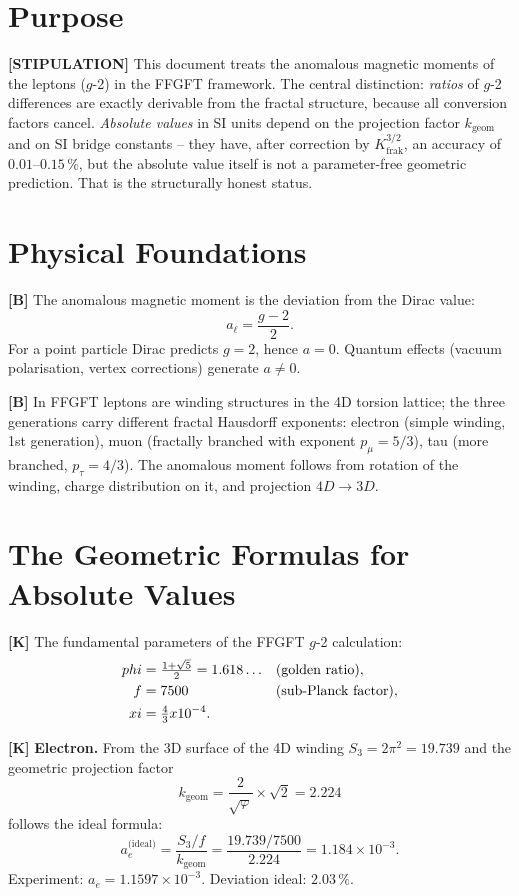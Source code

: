 \section{Purpose}

\textbf{[STIPULATION]} This document treats the anomalous magnetic moments of the
leptons ($g$-2) in the FFGFT framework. The central distinction: \emph{ratios} of
$g$-2 differences are exactly derivable from the fractal structure, because all
conversion factors cancel. \emph{Absolute values} in SI units depend on the
projection factor $k_\text{geom}$ and on SI bridge constants -- they have, after
correction by $K_\text{frak}^{3/2}$, an accuracy of $0{.}01$--$0{.}15\,\%$, but
the absolute value itself is not a parameter-free geometric prediction. That is
the structurally honest status.

\section{Physical Foundations}

\textbf{[B]} The anomalous magnetic moment is the deviation from the Dirac value:
\[
  a_\ell = \frac{g-2}{2}.
\]
For a point particle Dirac predicts $g=2$, hence $a=0$. Quantum effects (vacuum
polarisation, vertex corrections) generate $a\neq0$.

\textbf{[B]} In FFGFT leptons are winding structures in the 4D torsion lattice;
the three generations carry different fractal Hausdorff exponents: electron (simple
winding, 1st generation), muon (fractally branched with exponent $p_\mu=5/3$),
tau (more branched, $p_\tau=4/3$). The anomalous moment follows from rotation of
the winding, charge distribution on it, and projection $4D\to3D$.

\section{The Geometric Formulas for Absolute Values}

\textbf{[K]} The fundamental parameters of the FFGFT $g$-2 calculation:
\begin{align}
  \varphi &= \tfrac{1+\sqrt5}{2} = 1{.}618\ldots &&(\text{golden ratio}), \notag\\
  f       &= 7500 &&(\text{sub-Planck factor}), \notag\\
  \xi     &= \tfrac43\times10^{-4}. \notag
\end{align}

\textbf{[K]} \textbf{Electron.} From the 3D surface of the 4D winding
$S_3=2\pi^2=19{.}739$ and the geometric projection factor
\[
  k_\text{geom} = \frac{2}{\sqrt\varphi}\times\sqrt2 = 2{.}224
\]
follows the ideal formula:
\[
  a_e^\text{(ideal)} = \frac{S_3/f}{k_\text{geom}}
  = \frac{19{.}739/7500}{2{.}224} = 1{.}184\times10^{-3}.
\]
Experiment: $a_e=1{.}1597\times10^{-3}$. Deviation ideal: $2{.}03\,\%$.

